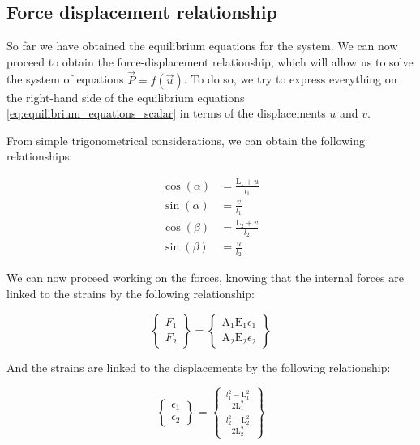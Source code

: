 \subsection{Force displacement relationship}
\label{subsec:force_displacement_relationship}

So far we have obtained the equilibrium equations for the system.
We can now proceed to obtain the force-displacement relationship, which will allow us to solve the system of equations ${\vec{P}} = f({\vec{u}})$.
To do so, we try to express everything on the right-hand side of the equilibrium equations \ref{eq:equilibrium_equations_scalar} in terms of the displacements $u$ and $v$.

From simple trigonometrical considerations, we can obtain the following relationships:

\begin{align}
    \cos(\alpha) & = \frac{\text{L}_1+u}{l_1} \\
    \sin(\alpha) & = \frac{v}{l_1}            \\
    \cos(\beta)  & = \frac{\text{L}_2+v}{l_2} \\
    \sin(\beta)  & = \frac{u}{l_2}
    \label{eq:trigonometrical_relationships}
\end{align}

We can now proceed working on the forces, knowing that the internal forces are linked to the strains by the following relationship:

\begin{equation}
    \begin{Bmatrix}
        F_1 \\
        F_2
    \end{Bmatrix}
    =
    \begin{Bmatrix}
        \text{A}_1 \text{E}_1 \epsilon_1 \\
        \text{A}_2 \text{E}_2 \epsilon_2
    \end{Bmatrix}
    \label{eq:internal_forces_strains_relationship}
\end{equation}

And the strains are linked to the displacements by the following relationship:

\begin{equation}
    \begin{Bmatrix}
        \epsilon_1 \\
        \epsilon_2
    \end{Bmatrix}
    =
    \begin{Bmatrix}
        \frac{l_1^2-\text{L}_1^2}{2 \text{L}_1^2} \\
        \frac{l_2^2-\text{L}_2^2}{2 \text{L}_2^2}
    \end{Bmatrix}
    \label{eq:strains_displacements_relationship}
\end{equation}

